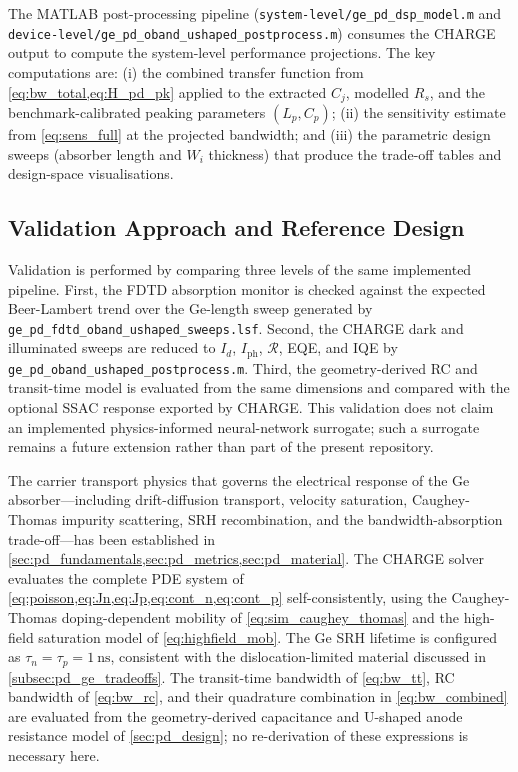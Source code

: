The MATLAB post-processing pipeline
(\texttt{system-level/ge\_pd\_dsp\_model.m} and
\texttt{device-level/ge\_pd\_oband\_ushaped\_postprocess.m}) consumes the CHARGE
output to compute the system-level performance projections. The key computations
are: (i) the combined transfer function from \cref{eq:bw_total,eq:H_pd_pk}
applied to the extracted $C_j$, modelled $R_s$, and the benchmark-calibrated
peaking parameters $(L_p,C_p)$; (ii) the sensitivity estimate from
\cref{eq:sens_full} at the projected bandwidth; and (iii) the parametric design
sweeps (absorber length and $W_i$ thickness) that produce the trade-off tables
and design-space visualisations.

\subsection[Validation Approach]{Validation Approach and Reference Design}
\label{subsec:pd_validation}

Validation is performed by comparing three levels of the same implemented
pipeline. First, the FDTD absorption monitor is checked against the expected
Beer-Lambert trend over the Ge-length sweep generated by
\texttt{ge\_pd\_fdtd\_oband\_ushaped\_sweeps.lsf}. Second, the CHARGE dark and
illuminated sweeps are reduced to $I_d$, $I_{\mathrm{ph}}$, $\mathcal{R}$,
EQE, and IQE by \texttt{ge\_pd\_oband\_ushaped\_postprocess.m}. Third, the
geometry-derived RC and transit-time model is evaluated from the same dimensions
and compared with the optional SSAC response exported by CHARGE. This validation
does not claim an implemented physics-informed neural-network surrogate; such a
surrogate remains a future extension rather than part of the present repository.


The carrier transport physics that governs the electrical response of
the Ge absorber---including drift-diffusion transport, velocity
saturation, Caughey-Thomas impurity scattering, SRH recombination,
and the bandwidth-absorption trade-off---has been established in
\cref{sec:pd_fundamentals,sec:pd_metrics,sec:pd_material}. The CHARGE
solver evaluates the complete PDE system of
\cref{eq:poisson,eq:Jn,eq:Jp,eq:cont_n,eq:cont_p} self-consistently,
using the Caughey-Thomas doping-dependent mobility of
\cref{eq:sim_caughey_thomas} and the high-field saturation model of
\cref{eq:highfield_mob}. The Ge SRH lifetime is configured as
$\tau_n=\tau_p=\SI{1}{\nano\second}$, consistent with the
dislocation-limited material discussed in
\cref{subsec:pd_ge_tradeoffs}. The transit-time bandwidth of
\cref{eq:bw_tt}, RC bandwidth of \cref{eq:bw_rc}, and their quadrature
combination in \cref{eq:bw_combined} are evaluated from the
geometry-derived capacitance and U-shaped anode resistance model of
\cref{sec:pd_design}; no re-derivation of these expressions is
necessary here.